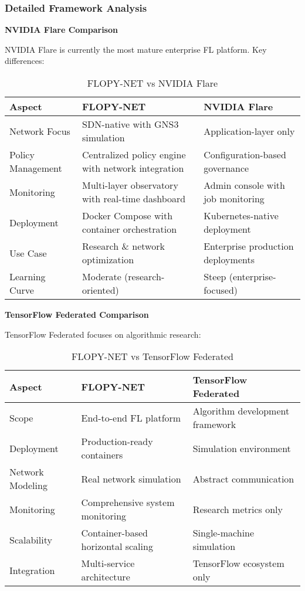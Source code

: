 \subsubsection{Detailed Framework Analysis}

\textbf{NVIDIA Flare Comparison}

NVIDIA Flare is currently the most mature enterprise FL platform. Key differences:

\begin{table}[H]
\centering
\caption{FLOPY-NET vs NVIDIA Flare}
\label{tab:flopynet-vs-nvidia-flare}
\begin{tabularx}{\textwidth}{@{}lXX@{}}
\toprule
\textbf{Aspect} & \textbf{FLOPY-NET} & \textbf{NVIDIA Flare} \\
\midrule
Network Focus & SDN-native with GNS3 simulation & Application-layer only \\
Policy Management & Centralized policy engine with network integration & Configuration-based governance \\
Monitoring & Multi-layer observatory with real-time dashboard & Admin console with job monitoring \\
Deployment & Docker Compose with container orchestration & Kubernetes-native deployment \\
Use Case & Research \& network optimization & Enterprise production deployments \\
Learning Curve & Moderate (research-oriented) & Steep (enterprise-focused) \\
\bottomrule
\end{tabularx}
\end{table}

\textbf{TensorFlow Federated Comparison}

TensorFlow Federated focuses on algorithmic research:

\begin{table}[H]
\centering
\caption{FLOPY-NET vs TensorFlow Federated}
\label{tab:flopynet-vs-tff}
\begin{tabularx}{\textwidth}{@{}lXX@{}}
\toprule
\textbf{Aspect} & \textbf{FLOPY-NET} & \textbf{TensorFlow Federated} \\
\midrule
Scope & End-to-end FL platform & Algorithm development framework \\
Deployment & Production-ready containers & Simulation environment \\
Network Modeling & Real network simulation & Abstract communication \\
Monitoring & Comprehensive system monitoring & Research metrics only \\
Scalability & Container-based horizontal scaling & Single-machine simulation \\
Integration & Multi-service architecture & TensorFlow ecosystem only \\
\bottomrule
\end{tabularx}
\end{table}

